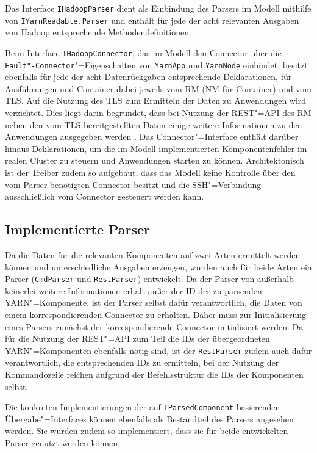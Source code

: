 Das Interface \texttt{IHadoopParser} dient als Einbindung des Parsers im Modell mithilfe von \texttt{IYarnReadable.Parser} und enthält für jede der acht relevanten Ausgaben von Hadoop entsprechende Methodendefinitionen.

Beim Interface \texttt{IHadoopConnector}, das im Modell den Connector über die \texttt{Fault"-Connector}"=Eigenschaften von \texttt{YarnApp} und \texttt{YarnNode} einbindet, besitzt ebenfalls für jede der acht Datenrückgaben entsprechende Deklarationen, für Ausführungen und Container dabei jeweils vom \ac{RM} (\ac{NM} für Container) und vom \ac{TLS}.
Auf die Nutzung des \ac{TLS} zum Ermitteln der Daten zu Anwendungen wird verzichtet.
Dies liegt darin begründet, dass bei Nutzung der REST"=API des \ac{RM} neben den vom \ac{TLS} bereitgestellten Daten einige weitere Informationen zu den Anwendungen ausgegeben werden \cite{HadoopRmApi271,HadoopYarnTlServer271}.
Das Connector"=Interface enthält darüber hinaus Deklarationen, um die im Modell implementierten Komponentenfehler im realen Cluster zu steuern und Anwendungen starten zu können.
Architektonisch ist der Treiber zudem so aufgebaut, dass das Modell keine Kontrolle über den vom Parser benötigten Connector besitzt und die SSH"=Verbindung ausschließlich vom Connector gesteuert werden kann.

\subsection{Implementierte Parser}
\label{sec:implementedParsers}

Da die Daten für die relevanten Komponenten auf zwei Arten ermittelt werden können und unterschiedliche Ausgaben erzeugen, wurden auch für beide Arten ein Parser (\texttt{CmdParser} und \texttt{RestParser}) entwickelt.
Da der Parser von außerhalb keinerlei weitere Informationen erhält außer der ID der zu parsenden YARN"=Komponente, ist der Parser selbst dafür verantwortlich, die Daten von einem korrespondierenden Connector zu erhalten.
Daher muss zur Initialisierung eines Parsers zunächst der korrespondierende Connector initialisiert werden.
Da für die Nutzung der REST"=API zum Teil die IDs der übergeordneten YARN"=Komponenten ebenfalls nötig sind, ist der \texttt{RestParser} zudem auch dafür verantwortlich, die entsprechenden IDs zu ermitteln, bei der Nutzung der Kommandozeile reichen aufgrund der Befehlsstruktur die IDs der Komponenten selbst.

Die konkreten Implementierungen der auf \texttt{IParsedComponent} basierenden Übergabe"=Interfaces können ebenfalls als Bestandteil des Parsers angesehen werden.
Sie wurden zudem so implementiert, dass sie für beide entwickelten Parser genutzt werden können.

